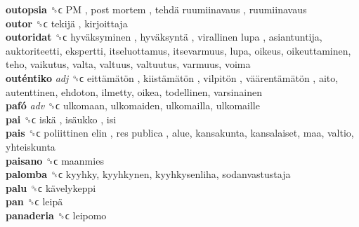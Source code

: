\textbf{outopsia} ␝ϲ   PM ,  post mortem ,  tehdä ruumiinavaus , ruumiinavaus  \\
\textbf{outor} ␝ϲ   tekijä , kirjoittaja  \\
\textbf{outoridat} ␝ϲ   hyväksyminen ,  hyväksyntä ,  virallinen lupa , asiantuntija, auktoriteetti, ekspertti, itseluottamus, itsevarmuus, lupa, oikeus, oikeuttaminen, teho, vaikutus, valta, valtuus, valtuutus, varmuus, voima  \\
\textbf{outéntiko} \emph{adj}  ␝ϲ   eittämätön ,  kiistämätön ,  vilpitön ,  väärentämätön , aito, autenttinen, ehdoton, ilmetty, oikea, todellinen, varsinainen  \\
\textbf{pafó} \emph{adv}  ␝ϲ  ulkomaan, ulkomaiden, ulkomailla, ulkomaille  \\
\textbf{pai} ␝ϲ   iskä ,  isäukko , isi  \\
\textbf{pais} ␝ϲ   poliittinen elin ,  res publica , alue, kansakunta, kansalaiset, maa, valtio, yhteiskunta  \\
\textbf{paisano} ␝ϲ  maanmies  \\
\textbf{palomba} ␝ϲ  kyyhky, kyyhkynen, kyyhkysenliha, sodanvastustaja  \\
\textbf{palu} ␝ϲ   kävelykeppi   \\
\textbf{pan} ␝ϲ   leipä   \\
\textbf{panaderia} ␝ϲ  leipomo  \\
